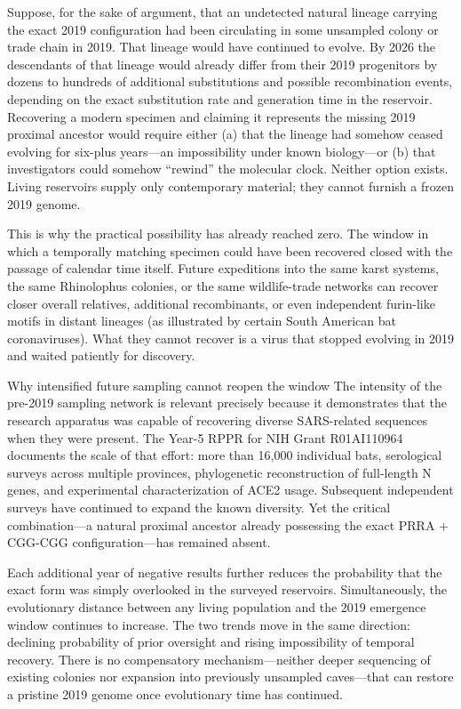 Suppose, for the sake of argument, that an undetected natural lineage carrying the exact 2019 configuration had been circulating in some unsampled colony or trade chain in 2019. That lineage would have continued to evolve. By 2026 the descendants of that lineage would already differ from their 2019 progenitors by dozens to hundreds of additional substitutions and possible recombination events, depending on the exact substitution rate and generation time in the reservoir. Recovering a modern specimen and claiming it represents the missing 2019 proximal ancestor would require either (a) that the lineage had somehow ceased evolving for six-plus years—an impossibility under known biology—or (b) that investigators could somehow “rewind” the molecular clock. Neither option exists. Living reservoirs supply only contemporary material; they cannot furnish a frozen 2019 genome.

This is why the practical possibility has already reached zero. The window in which a temporally matching specimen could have been recovered closed with the passage of calendar time itself. Future expeditions into the same karst systems, the same Rhinolophus colonies, or the same wildlife-trade networks can recover closer overall relatives, additional recombinants, or even independent furin-like motifs in distant lineages (as illustrated by certain South American bat coronaviruses). What they cannot recover is a virus that stopped evolving in 2019 and waited patiently for discovery.

Why intensified future sampling cannot reopen the window
The intensity of the pre-2019 sampling network is relevant precisely because it demonstrates that the research apparatus was capable of recovering diverse SARS-related sequences when they were present. The Year-5 RPPR for NIH Grant R01AI110964 documents the scale of that effort: more than 16,000 individual bats, serological surveys across multiple provinces, phylogenetic reconstruction of full-length N genes, and experimental characterization of ACE2 usage. Subsequent independent surveys have continued to expand the known diversity. Yet the critical combination—a natural proximal ancestor already possessing the exact PRRA + CGG-CGG configuration—has remained absent.

Each additional year of negative results further reduces the probability that the exact form was simply overlooked in the surveyed reservoirs. Simultaneously, the evolutionary distance between any living population and the 2019 emergence window continues to increase. The two trends move in the same direction: declining probability of prior oversight and rising impossibility of temporal recovery. There is no compensatory mechanism—neither deeper sequencing of existing colonies nor expansion into previously unsampled caves—that can restore a pristine 2019 genome once evolutionary time has continued.


